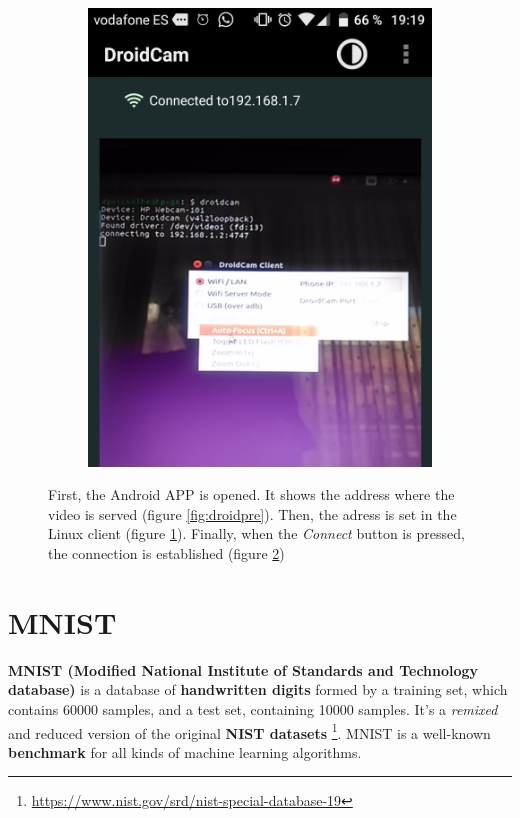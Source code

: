 \begin{figure}
\begin{subfigure}{0.33\textwidth}
		\caption{}
		\label{fig:droidlinux}
	\end{subfigure}%
	\begin{subfigure}{0.33\textwidth}
		\centering
		\includegraphics[width=0.9\linewidth]{figures/droidcampost.png}
		\caption{}
		\label{fig:droidpost}
	\end{subfigure}
	\caption[DroidCam usage]{First, the Android APP is opened. It shows the address where the video is served (figure \ref{fig:droidpre}). Then, the adress is set in the Linux client (figure \ref{fig:droidlinux}). Finally, when the \textit{Connect} button is pressed, the connection is established (figure \ref{fig:droidpost})}
	\label{fig:droidcam}
\end{figure}
	
\section{MNIST}\label{sec:MNIST}
\textbf{MNIST (Modified National Institute of Standards and Technology database)} \cite{lecun-mnisthandwrittendigit-2010} is a database of \textbf{handwritten digits} formed by a training set, which contains 60000 samples, and a test set, containing 10000 samples. It's a \textit{remixed} and reduced version of the original \textbf{NIST datasets} \footnote{\url{https://www.nist.gov/srd/nist-special-database-19}}. MNIST is a well-known \textbf{benchmark} for all kinds of machine learning algorithms.

